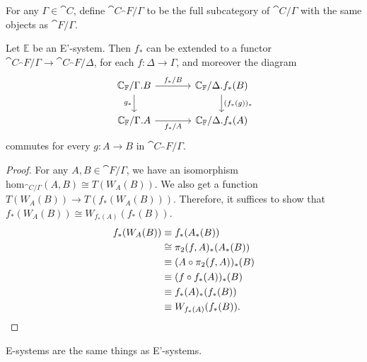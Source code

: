 \begin{defn}
For any $\Gamma\in\cat{C}$, define $\cat{C}_\cat{F}/\Gamma$ to be the full
subcategory of $\cat{C}/\Gamma$ with the same objects as $\cat{F}/\Gamma$. 
\end{defn}

\begin{thm}
Let $\mathbb{E}$ be an E'-system. Then $f_\ast$ can be extended to a functor
$\cat{C}_\cat{F}/\Gamma\to\cat{C}_\cat{F}/\Delta$, for each $f:\Delta\to\Gamma$, and moreover the diagram
\begin{equation*}
\begin{tikzcd}[column sep=large]
\cat{C}_\cat{F}/\ctxext{\Gamma}{B} \arrow[r,"{f_\ast/B}"] \arrow[d,swap,"{g_\ast}"]
& \cat{C}_\cat{F}/\ctxext{\Delta}{f_\ast(B)} \arrow[d,"{(f_\ast(g))_\ast}"] \\
\cat{C}_\cat{F}/\ctxext{\Gamma}{A} \arrow[r,swap,"{f_\ast/A}"]
& \cat{C}_\cat{F}/\ctxext{\Delta}{f_\ast(A)}
\end{tikzcd}
\end{equation*}
commutes for every $g:A\to B$ in $\cat{C}_\cat{F}/\Gamma$.
\end{thm}

\begin{proof}
For any $A,B\in\cat{F}/\Gamma$, we have an isomorphism
$\mathrm{hom}_{\cat{C}/\Gamma}(A,B)\cong T(W_A(B))$. We also get a function
$T(W_A(B))\to T(f_\ast(W_A(B)))$. Therefore, it suffices to show that
$f_\ast(W_A(B))\cong W_{f_\ast(A)}(f_\ast(B))$. 
\begin{align*}
f_\ast(W_A(B))
& \equiv f_\ast(A_\ast(B)) \\
& \cong \pi_2(f,A)_\ast(A_\ast(B)) \\
& \equiv (A\circ\pi_2(f,A))_\ast(B) \\
& \equiv (f\circ f_\ast(A))_\ast(B) \\
& \equiv f_\ast(A)_\ast(f_\ast(B)) \\
& \equiv W_{f_\ast(A)}(f_\ast(B)). \qedhere
\end{align*}
\end{proof}

\begin{thm}
E-systems are the same things as E'-systems.
\end{thm}

